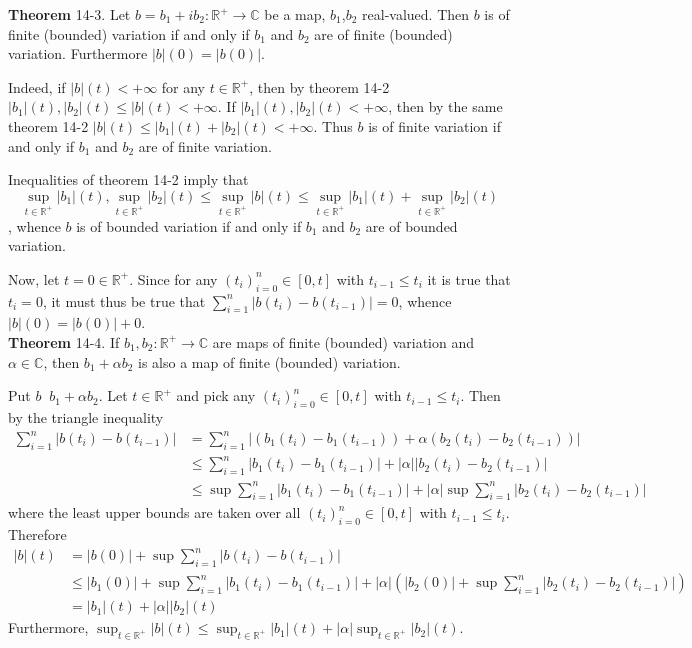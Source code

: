 \documentclass[a4paper]{article}
\newcommand{\clo}[1]{\left [ #1 \right ]}
\newcommand{\brac}[1]{\left ( #1 \right )}
\newcommand{\abs}[1]{\left | #1 \right |}
\newcommand{\Real}{\mathbb{R}}
\newcommand{\Cplx}{\mathbb{C}}
\newcommand{\defn}{\mathop{\overset{\Delta}{=}}\nolimits}
\begin{document}
\label{thm:cplx_total_var}\noindent\textbf{Theorem} 14-3.
Let $b=b_1 + i b_2:\Real^+\to\Cplx$ be a map, $b_1$,$b_2$ real-valued. Then $b$ is of finite (bounded) variation if and only if $b_1$ and $b_2$ are of finite (bounded) variation. Furthermore $\abs{b}\brac{0}=\abs{b\brac{0}}$.

Indeed, if $\abs{b}\brac{t}<+\infty$ for any $t\in \Real^+$, then by theorem 14-2 $\abs{b_1}\brac{t},\abs{b_2}\brac{t}\leq \abs{b}\brac{t}<+\infty$. If $\abs{b_1}\brac{t},\abs{b_2}\brac{t}<+\infty$, then by the same theorem 14-2 $\abs{b}\brac{t}\leq \abs{b_1}\brac{t}+\abs{b_2}\brac{t}<+\infty$. Thus $b$ is of finite variation if and only if $b_1$ and $b_2$ are of finite variation.

Inequalities of theorem 14-2 imply that \[\sup_{t\in\Real^+}\abs{b_1}\brac{t},\sup_{t\in\Real^+}\abs{b_2}\brac{t}\leq\sup_{t\in\Real^+}\abs{b}\brac{t}\leq \sup_{t\in\Real^+}\abs{b_1}\brac{t}+\sup_{t\in\Real^+}\abs{b_2}\brac{t}\], whence $b$ is of bounded variation if and only if $b_1$ and $b_2$ are of bounded variation.

Now, let $t=0\in \Real^+$. Since for any $\brac{t_i}_{i=0}^n\in\clo{0,t}$ with $t_{i-1}\leq t_i$ it is true that $t_i=0$, it must thus be true that $\sum_{i=1}^n\abs{b\brac{t_i}-b\brac{t_{i-1}}} = 0$, whence $\abs{b}\brac{0} = \abs{b\brac{0}}+0$.\\

\label{thm:tot_var_map_lin_comb}\noindent\textbf{Theorem} 14-4.
If $b_1,b_2:\Real^+\to\Cplx$ are maps of finite (bounded) variation and $\alpha\in\Cplx$, then $b_1+\alpha b_2$ is also a map of finite (bounded) variation.

Put $b\defn b_1+\alpha b_2$. Let $t\in \Real^+$ and pick any $\brac{t_i}_{i=0}^n\in\clo{0,t}$ with $t_{i-1}\leq t_i$. Then by the triangle inequality\begin{align*} \sum_{i=1}^n\abs{b\brac{t_i}-b\brac{t_{i-1}}} &= \sum_{i=1}^n\abs{\brac{b_1\brac{t_i}-b_1\brac{t_{i-1}}} + \alpha \brac{ b_2\brac{t_i}-b_2\brac{t_{i-1}}}}\\ &\leq \sum_{i=1}^n \abs{b_1\brac{t_i}-b_1\brac{t_{i-1}}} + \abs{\alpha} \abs{ b_2\brac{t_i}-b_2\brac{t_{i-1}}}\\ &\leq \sup\sum_{i=1}^n\abs{b_1\brac{t_i}-b_1\brac{t_{i-1}}} + \abs{\alpha} \sup\sum_{i=1}^n\abs{ b_2\brac{t_i}-b_2\brac{t_{i-1}}}\end{align*} where the least upper bounds are taken over all $\brac{t_i}_{i=0}^n\in\clo{0,t}$ with $t_{i-1}\leq t_i$. Therefore \begin{align*}\abs{b}\brac{t} &= \abs{b\brac{0}} + \sup\sum_{i=1}^n\abs{ b\brac{t_i}-b\brac{t_{i-1}}}\\&\leq \abs{b_1\brac{0}} + \sup\sum_{i=1}^n\abs{b_1\brac{t_i}-b_1\brac{t_{i-1}}} + \abs{\alpha} \brac{\abs{b_2\brac{0}}+\sup\sum_{i=1}^n\abs{ b_2\brac{t_i}-b_2\brac{t_{i-1}}}}\\& = \abs{b_1}\brac{t} + \abs{\alpha}\abs{b_2}\brac{t}\end{align*} Furthermore, $\sup_{t\in\Real^+} \abs{b}\brac{t}\leq \sup_{t\in\Real^+} \abs{b_1}\brac{t} + \abs{\alpha} \sup_{t\in\Real^+} \abs{b_2}\brac{t}$.
\end{document}
